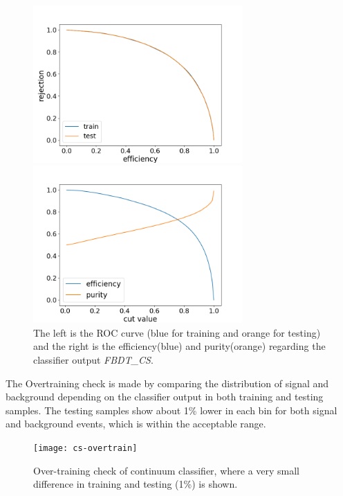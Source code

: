\begin{figure}[htpb]
	\begin{minipage}[b]{0.5\linewidth}
		\centering 
		\includegraphics[height=6cm]{figures/ROC_CS}	
	\end{minipage}
	\begin{minipage}[b]{0.5\linewidth}
		\centering 
		\includegraphics[height=6cm]{figures/eff_CS}	
	\end{minipage}
\caption{The left is the ROC curve (blue for training and orange for testing)
	and the right is the efficiency(blue) and purity(orange) regarding the classifier output \textit{FBDT\_CS}.}
	\label{fig:cs_roc}
\end{figure}

The Overtraining check is made by comparing the distribution of signal and background depending on the classifier output in both training and testing samples. The testing samples show about 1\% lower in each bin for both signal and background events, which is within the acceptable range.  
\begin{figure}[htpb]
	\centering
	\texttt{[image: cs-overtrain]}
	\caption{Over-training check of continuum classifier, where a very small difference in training and testing (1\%) is shown.}
\end{figure}


